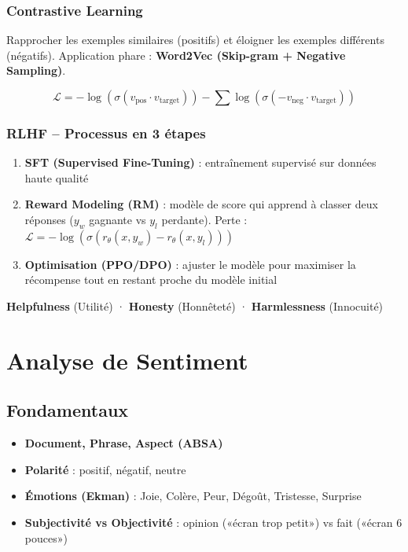 \documentclass[a4paper,10pt]{article}
\begin{document}
\subsubsection{Contrastive Learning}
\begin{definitionbox}[Principe]
Rapprocher les exemples similaires (positifs) et éloigner les exemples différents (négatifs). Application phare : \textbf{Word2Vec (Skip-gram + Negative Sampling)}.
\end{definitionbox}
\begin{formulebox}
\[
\mathcal{L} = -\log(\sigma(v_{\text{pos}} \cdot v_{\text{target}})) - \sum \log(\sigma(-v_{\text{neg}} \cdot v_{\text{target}}))
\]
\end{formulebox}

\subsubsection{RLHF -- Processus en 3 étapes}
\begin{enumerate}
  \item \textbf{SFT (Supervised Fine-Tuning)} : entraînement supervisé sur données haute qualité
  \item \textbf{Reward Modeling (RM)} : modèle de score qui apprend à classer deux réponses ($y_w$ gagnante vs $y_l$ perdante). Perte : $\mathcal{L} = -\log(\sigma(r_\theta(x, y_w) - r_\theta(x, y_l)))$
  \item \textbf{Optimisation (PPO/DPO)} : ajuster le modèle pour maximiser la récompense tout en restant proche du modèle initial
\end{enumerate}

\begin{keybox}
\textbf{Helpfulness} (Utilité) · \textbf{Honesty} (Honnêteté) · \textbf{Harmlessness} (Innocuité)
\end{keybox}

\section{Analyse de Sentiment}

\subsection{Fondamentaux}

\begin{definitionbox}
\begin{itemize}
  \item \textbf{Document, Phrase, Aspect (ABSA)}
  \item \textbf{Polarité} : positif, négatif, neutre
  \item \textbf{Émotions (Ekman)} : Joie, Colère, Peur, Dégoût, Tristesse, Surprise
  \item \textbf{Subjectivité vs Objectivité} : opinion («écran trop petit») vs fait («écran 6 pouces»)
\end{itemize}
\end{definitionbox}
\end{document}
